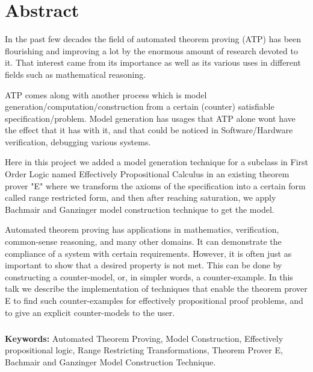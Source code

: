 \chapter*{Abstract}
\label{chap:abstract}

In the past few decades the field of automated theorem proving (ATP) has been flourishing and improving a lot by the enormous amount of research devoted to it. That interest came from its importance as well as its various uses in different fields such as mathematical reasoning.



ATP comes along with another process which is model generation/computation/construction from a certain (counter) satisfiable specification/problem. Model generation has usages that ATP alone wont have the effect that it has with it, and that could be noticed in Software/Hardware verification, debugging various systems.



Here in this project we added a model generation technique for a subclass in First Order Logic named Effectively Propositional Calculus in an existing theorem prover "E" where we transform the axioms of the specification into a certain form called range restricted form, and then after reaching saturation, we apply Bachmair and Ganzinger model construction technique to get the model.



Automated theorem proving has applications in mathematics, verification, common-sense reasoning, and many other domains. It can demonstrate the compliance of a system with certain requirements. However, it is often just as important to show that a desired property is not met. This can be done by constructing a counter-model, or, in simpler words, a counter-example. In this talk we describe the implementation of techniques that enable the theorem prover E to find such counter-examples for effectively propositional proof problems, and to give an explicit counter-models to the user.


\paragraph{}
\textbf{Keywords:} Automated Theorem Proving, Model Construction, Effectively propositional logic, Range Restricting Transformations, Theorem Prover E, Bachmair and Ganzinger Model Construction Technique.  
